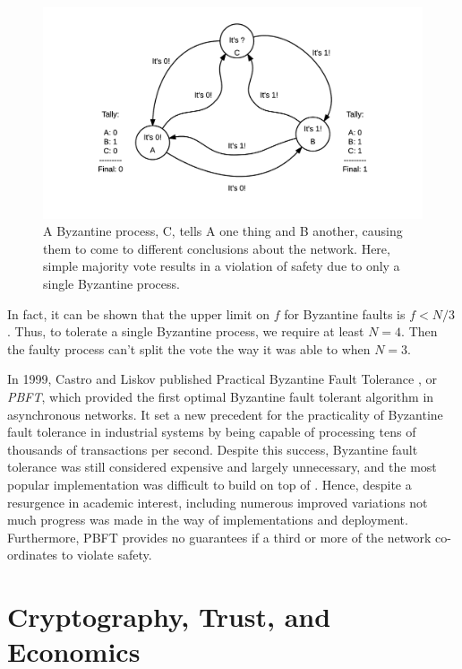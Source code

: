 \begin{figure}[]
	\includegraphics[width=\linewidth,height=\textheight,keepaspectratio]{figures/diagrams/byzantine.png}
    	\centering
	\caption[Byzantine processes tell lies]{
A Byzantine process, C, tells A one thing and B another, causing them to come to different conclusions about the network.
Here, simple majority vote results in a violation of safety due to only a single Byzantine process.}
	\label{fig:byzantine}
\end{figure}


In fact, it can be shown that the upper limit on $f$ for Byzantine faults is $f < N/3$ \cite{pease1980reaching}.
Thus, to tolerate a single Byzantine process, we require at least $N=4$. 
Then the faulty process can't split the vote the way it was able to when $N=3$.

In 1999, Castro and Liskov published Practical Byzantine Fault Tolerance \cite{pbft}, or \emph{PBFT}, 
which provided the first optimal Byzantine fault tolerant algorithm in asynchronous networks.
It set a new precedent for the practicality of Byzantine fault tolerance in industrial systems by being capable 
of processing tens of thousands of transactions per second.
Despite this success, Byzantine fault tolerance was still considered expensive and largely unnecessary, 
and the most popular implementation was difficult to build on top of \cite{ppbft}.
Hence, despite a resurgence in academic interest, including numerous improved variations \cite{yin2003separating, kotla2007zyzzyva}
not much progress was made in the way of implementations and deployment.
Furthermore, PBFT provides no guarantees if a third or more of the network co-ordinates to violate safety.

\section{Cryptography, Trust, and Economics}

